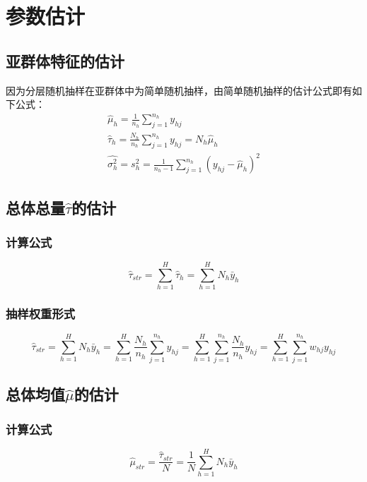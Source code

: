 \section{参数估计}

\subsection{亚群体特征的估计}
因为分层随机抽样在亚群体中为简单随机抽样，由简单随机抽样的估计公式即有如下公式：
\begin{gather*}
	\hat{\mu}_h=\frac{1}{n_h}\sum_{j=1}^{n_h}y_{hj} \\
	\hat{\tau}_h=\frac{N_h}{n_h}\sum_{j=1}^{n_h}y_{hj}=N_h\hat{\mu}_h \\
	\hat{\sigma^2_h}=s^2_h=\frac{1}{n_h-1}\sum_{j=1}^{n_h}\left(y_{hj}-\hat{\mu}_h\right)^2
\end{gather*}

\subsection{总体总量$\hat{\tau}$的估计}
\subsubsection{计算公式}
\begin{equation*}
	\hat{\tau}_{str}=\sum_{h=1}^H\hat{\tau}_h=\sum_{h=1}^HN_h\bar{y}_h
\end{equation*}
\subsubsection{抽样权重形式}
\begin{equation*}
	\hat{\tau}_{str}=\sum_{h=1}^HN_h\bar{y}_h=\sum_{h=1}^H\frac{N_h}{n_h}\sum_{j=1}^{n_h}y_{hj}=\sum_{h=1}^H\sum_{j=1}^{n_h}\frac{N_h}{n_h}y_{hj}=\sum_{h=1}^H\sum_{j=1}^{n_h}w_{hj}y_{hj}
\end{equation*}

\subsection{总体均值$\hat{\mu}$的估计}
\subsubsection{计算公式}
\begin{equation*}
	\hat{\mu}_{str}=\frac{\hat{\tau}_{str}}{N}=\frac{1}{N}\sum_{h=1}^HN_h\bar{y}_h
\end{equation*}
